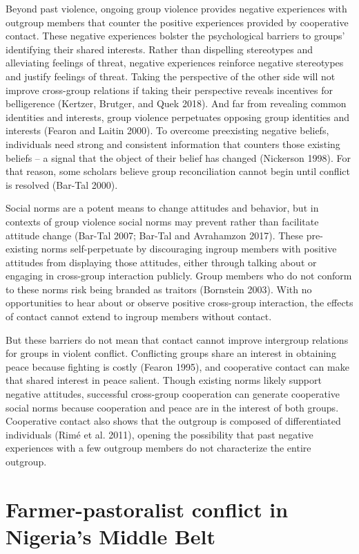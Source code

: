 \documentclass[11pt]{article}
\begin{document}
Beyond past violence, ongoing group violence provides negative
experiences with outgroup members that counter the positive experiences
provided by cooperative contact. These negative experiences bolster the
psychological barriers to groups' identifying their shared interests.
Rather than dispelling stereotypes and alleviating feelings of threat,
negative experiences reinforce negative stereotypes and justify feelings
of threat. Taking the perspective of the other side will not improve
cross-group relations if taking their perspective reveals incentives for
belligerence (Kertzer, Brutger, and Quek 2018). And far from revealing
common identities and interests, group violence perpetuates opposing
group identities and interests (Fearon and Laitin 2000). To overcome
preexisting negative beliefs, individuals need strong and consistent
information that counters those existing beliefs -- a signal that the
object of their belief has changed (Nickerson 1998). For that reason,
some scholars believe group reconciliation cannot begin until conflict
is resolved (Bar-Tal 2000).

Social norms are a potent means to change attitudes and behavior, but in
contexts of group violence social norms may prevent rather than
facilitate attitude change (Bar-Tal 2007; Bar-Tal and Avrahamzon 2017).
These pre-existing norms self-perpetuate by discouraging ingroup members
with positive attitudes from displaying those attitudes, either through
talking about or engaging in cross-group interaction publicly. Group
members who do not conform to these norms risk being branded as traitors
(Bornstein 2003). With no opportunities to hear about or observe
positive cross-group interaction, the effects of contact cannot extend
to ingroup members without contact.

But these barriers do not mean that contact cannot improve intergroup
relations for groups in violent conflict. Conflicting groups share an
interest in obtaining peace because fighting is costly (Fearon 1995),
and cooperative contact can make that shared interest in peace salient.
Though existing norms likely support negative attitudes, successful
cross-group cooperation can generate cooperative social norms because
cooperation and peace are in the interest of both groups. Cooperative
contact also shows that the outgroup is composed of differentiated
individuals (Rimé et al. 2011), opening the possibility that past
negative experiences with a few outgroup members do not characterize the
entire outgroup.

\hypertarget{farmer-pastoralist-conflict-in-nigerias-middle-belt}{%
\section{Farmer-pastoralist conflict in Nigeria's Middle
Belt}\label{farmer-pastoralist-conflict-in-nigerias-middle-belt}}
\end{document}

